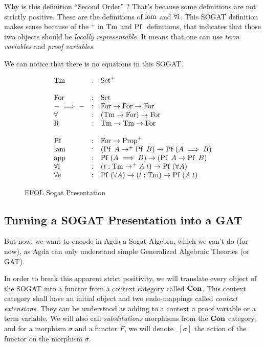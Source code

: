 \documentclass[10pt,a4paper]{article}
\begin{document}
		Why is this definition \enquote{Second Order} ? That's because some definitions are not strictly positive. These are the definitions of $\operatorname{lam}$ and $\operatorname{\operatorname{\forall i}}$. This SOGAT definition makes sense because of the ${}^+$ in $\operatorname{Tm}$ and $\operatorname{Pf}\;$ definitions, that indicates that those two objects should be \emph{locally representable}. It means that one can use \emph{term variables} and \emph{proof variables}.
		
		We can notice that there is no equations in this SOGAT.
		
		\begin{figure}
		\begin{tcolorbox}
			\[
			\begin{array}{lcl}
				\operatorname{Tm} & : & \operatorname{Set}^+ \\
				\\
				\operatorname{For} & : & \operatorname{Set} \\
				- \implies - & : & \operatorname{For} \rightarrow \operatorname{For} \rightarrow \operatorname{For}\\
				\forall & : & (\operatorname{Tm} \rightarrow \operatorname{For}) \rightarrow \operatorname{For} \\
				\operatorname{R} & : & \operatorname{Tm} \rightarrow \operatorname{Tm} \rightarrow \operatorname{For}\\
				\\
				\operatorname{Pf}\; & : & \operatorname{For} \rightarrow \operatorname{Prop}^+ \\
				\operatorname{lam} & : & (\operatorname{Pf}\; A \rightarrow^+ \operatorname{Pf}\; B) \rightarrow \operatorname{Pf}\; (A \implies B)\\
				\operatorname{app} & : & \operatorname{Pf}\; (A \implies B) \rightarrow (\operatorname{Pf}\; A \rightarrow \operatorname{Pf}\; B)\\
				\operatorname{\operatorname{\forall i}} & : & (t : \operatorname{Tm} \rightarrow^+ A\;t) \rightarrow \operatorname{Pf}\; (\forall A)\\
				\operatorname{\operatorname{\forall e}} & : & \operatorname{Pf}\; (\forall A) \rightarrow (t : \operatorname{Tm}) \rightarrow \operatorname{Pf}\; (A\;t)\\
			\end{array}
			\]
		\end{tcolorbox}
		\caption{FFOL Sogat Presentation}
		\label{fig:ffol-sogat}
		\end{figure}
	
		\subsection{Turning a SOGAT Presentation into a GAT}
		
			But now, we want to encode in Agda a Sogat Algebra, which we can't do (for now), as Agda can only understand simple Generalized Algebraic Theories (or GAT).
			
			In order to break this apparent strict positivity, we will translate every object of the SOGAT into a functor from a context category called $\textbf{Con}$. This context category shall have an initial object and two endo-mappings called \emph{context extensions}. They can be understood as adding to a context a proof variable or a term variable. We will also call \emph{substitutions} morphisms from the $\textbf{Con}$ category, and for a morphism $\sigma$ and a functor $F$, we will denote $\_\left[\sigma\right]$ the action of the functor on the morphism $\sigma$.
			
\end{document}
